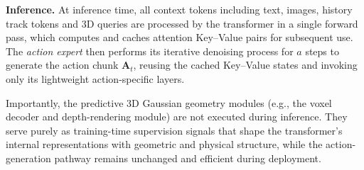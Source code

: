 \noindent
\textbf{Inference.}
%
At inference time, all context tokens including text, images, history track tokens and 3D queries are processed by the transformer in a single forward pass, which computes and caches attention Key--Value pairs for subsequent use. The \emph{action expert} then performs its iterative denoising process for $a$ steps to generate the action chunk $\mathbf{A}_t$, reusing the cached Key--Value states and invoking only its lightweight action-specific layers.

Importantly, the predictive 3D Gaussian geometry modules (e.g., the voxel decoder and depth-rendering module) are not executed during inference. They serve purely as training-time supervision signals that shape the transformer's internal representations with geometric and physical structure, while the action-generation pathway remains unchanged and efficient during deployment.


